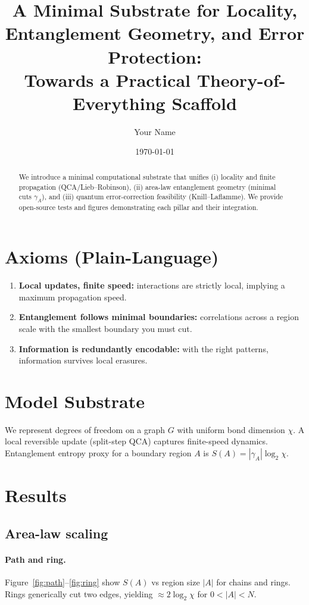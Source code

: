 \documentclass[11pt]{article}
\title{A Minimal Substrate for Locality, Entanglement Geometry, and Error Protection:\\
Towards a Practical Theory-of-Everything Scaffold}
\author[1]{Your Name}
\affil[1]{Your Affiliation}
\date{\today}
\begin{document}
\maketitle

\begin{abstract}
We introduce a minimal computational substrate that unifies (i) locality and finite propagation (QCA/Lieb--Robinson), (ii) area-law entanglement geometry (minimal cuts $\gamma_A$), and (iii) quantum error-correction feasibility (Knill--Laflamme). We provide open-source tests and figures demonstrating each pillar and their integration.
\end{abstract}

\section{Axioms (Plain-Language)}
\begin{enumerate}
  \item \textbf{Local updates, finite speed:} interactions are strictly local, implying a maximum propagation speed.
  \item \textbf{Entanglement follows minimal boundaries:} correlations across a region scale with the smallest boundary you must cut.
  \item \textbf{Information is redundantly encodable:} with the right patterns, information survives local erasures.
\end{enumerate}

\section{Model Substrate}
We represent degrees of freedom on a graph $G$ with uniform bond dimension $\chi$. A local reversible update (split-step QCA) captures finite-speed dynamics. Entanglement entropy proxy for a boundary region $A$ is $S(A)=|\gamma_A|\log_2\chi$.

\section{Results}
\subsection{Area-law scaling}
\paragraph{Path and ring.} Figure~\ref{fig:path}--\ref{fig:ring} show $S(A)$ vs region size $|A|$ for chains and rings. Rings generically cut two edges, yielding $\approx 2\log_2\chi$ for $0<|A|<N$.
\end{document}
